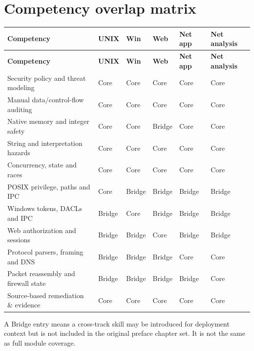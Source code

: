 \documentclass[10pt,letterpaper]{article}
\begin{document}
\section{Competency overlap matrix}
\begingroup\footnotesize\setlength\tabcolsep{3pt}
\begin{longtable}{>{\raggedright\arraybackslash}p{}>{\raggedright\arraybackslash}p{}>{\raggedright\arraybackslash}p{}>{\raggedright\arraybackslash}p{}>{\raggedright\arraybackslash}p{}>{\raggedright\arraybackslash}p{}}\toprule
\textbf{Competency} & \textbf{UNIX} & \textbf{Win} & \textbf{Web} & \textbf{Net app} & \textbf{Net analysis}\\\midrule\endfirsthead
\toprule \textbf{Competency} & \textbf{UNIX} & \textbf{Win} & \textbf{Web} & \textbf{Net app} & \textbf{Net analysis}\\\midrule\endhead
Security policy and threat modeling & Core & Core & Core & Core & Core\\\midrule
Manual data/control-flow auditing & Core & Core & Core & Core & Core\\\midrule
Native memory and integer safety & Core & Core & Bridge & Core & Core\\\midrule
String and interpretation hazards & Core & Core & Core & Core & Core\\\midrule
Concurrency, state and races & Core & Core & Core & Core & Core\\\midrule
POSIX privilege, paths and IPC & Core & Bridge & Bridge & Bridge & Bridge\\\midrule
Windows tokens, DACLs and IPC & Bridge & Core & Bridge & Bridge & Bridge\\\midrule
Web authorization and sessions & Bridge & Bridge & Core & Bridge & Bridge\\\midrule
Protocol parsers, framing and DNS & Bridge & Bridge & Bridge & Core & Core\\\midrule
Packet reassembly and firewall state & Bridge & Bridge & Bridge & Bridge & Core\\\midrule
Source-based remediation \& evidence & Core & Core & Core & Core & Core\\\midrule
\bottomrule\end{longtable}\endgroup
A Bridge entry means a cross-track skill may be introduced for deployment context but is not included in the original preface chapter set. It is not the same as full module coverage.
\end{document}
